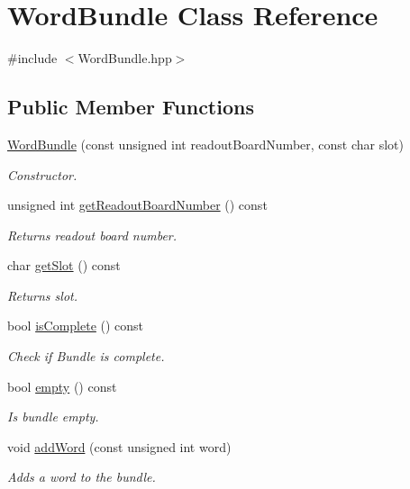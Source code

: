 \hypertarget{class_word_bundle}{}\section{Word\+Bundle Class Reference}
\label{class_word_bundle}


{\ttfamily \#include $<$Word\+Bundle.\+hpp$>$}

\subsection*{Public Member Functions}
\begin{DoxyCompactItemize}
\item 
\hyperlink{class_word_bundle_aa619f7a96823c2dfe048676e65064ca4}{Word\+Bundle} (const unsigned int readout\+Board\+Number, const char slot)
\begin{DoxyCompactList}\small\item\em Constructor. \end{DoxyCompactList}\item 
unsigned int \hyperlink{class_word_bundle_a6d781e8e2bf5b1c0b67346bd6fd44ff9}{get\+Readout\+Board\+Number} () const
\begin{DoxyCompactList}\small\item\em Returns readout board number. \end{DoxyCompactList}\item 
char \hyperlink{class_word_bundle_a4a8540008b739e4e4b94e665c2e24991}{get\+Slot} () const
\begin{DoxyCompactList}\small\item\em Returns slot. \end{DoxyCompactList}\item 
bool \hyperlink{class_word_bundle_a0a817b8d4266b5c2418743bf46ef5dee}{is\+Complete} () const
\begin{DoxyCompactList}\small\item\em Check if Bundle is complete. \end{DoxyCompactList}\item 
bool \hyperlink{class_word_bundle_a18bcb8912a877fa9e60cd8ec707e75a3}{empty} () const
\begin{DoxyCompactList}\small\item\em Is bundle empty. \end{DoxyCompactList}\item 
void \hyperlink{class_word_bundle_a167d2b6b4f504e4347191a8e5bb47e5e}{add\+Word} (const unsigned int word)
\begin{DoxyCompactList}\small\item\em Adds a word to the bundle. \end{DoxyCompactList}\item 

\end{DoxyCompactItemize}
